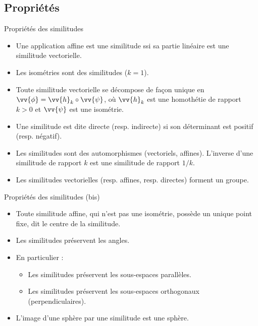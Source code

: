 \documentclass[bigger]{m53beamer}
\begin{document}
\subsection{Propriétés}
\begin{frame}{Propriétés des similitudes}
  \begin{itemize}[<+(1)->]
    \item Une application affine est une similitude ssi sa partie linéaire est une similitude vectorielle.
    \item Les isométries sont des similitudes ($k=1$).
    \item Toute similitude vectorielle se décompose de façon unique en $\vv{\phi} = \vv{h}_{k}\circ \vv{\psi}$, où $\vv{h}_{k}$ est une homothétie de rapport $k > 0$ et $\vv{\psi}$ est une isométrie.
    \item Une similitude est dite \alert{directe} (resp. \alert{indirecte}) si son déterminant est positif (resp. négatif).
    \item Les similitudes sont des automorphismes (vectoriels, affines). L'inverse d'une similitude de rapport $k$ est une similitude de rapport $1/k$.
    \item Les similitudes vectorielles (resp. affines, resp. directes) forment un groupe.
  \end{itemize}
\end{frame}
\begin{frame}{Propriétés des similitudes (bis)}
  \begin{itemize}[<+(1)->]
    \item Toute similitude affine, qui n'est pas une isométrie, possède un unique point fixe, dit \alert{le centre de la similitude}.
    \item Les similitudes préservent les angles.
    \item En particulier :
    \begin{itemize}[<+(1)->]
      \item Les similitudes préservent les sous-espaces parallèles.
      \item Les similitudes préservent les sous-espaces orthogonaux (perpendiculaires).
    \end{itemize}
    \item L'image d'une sphère par une similitude est une sphère.
  \end{itemize}
\end{frame}
\end{document}

